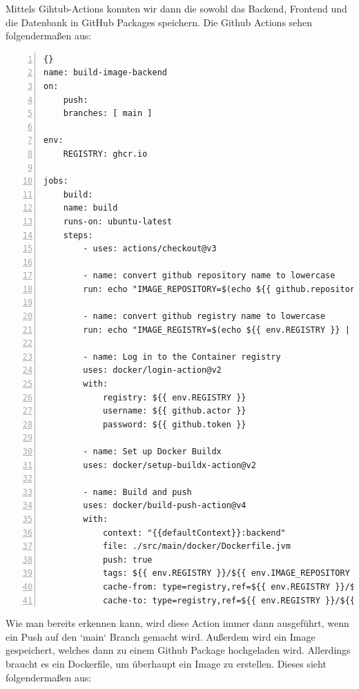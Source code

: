 \newpage

Mittels Gihtub-Actions konnten wir dann die sowohl das Backend, Frontend und die Datenbank in GitHub Packages speichern. Die Github Actions sehen folgendermaßen aus:

\begin{lstlisting}[numbers=left,caption={Github Actions für das Backend},label={lst:gh_action_Backend}]{}
name: build-image-backend
on:
    push:
    branches: [ main ]

env:
    REGISTRY: ghcr.io

jobs:
    build:
    name: build
    runs-on: ubuntu-latest
    steps:
        - uses: actions/checkout@v3

        - name: convert github repository name to lowercase
        run: echo "IMAGE_REPOSITORY=$(echo ${{ github.repository }} | tr '[:upper:]' '[:lower:]')" >> $GITHUB_ENV

        - name: convert github registry name to lowercase
        run: echo "IMAGE_REGISTRY=$(echo ${{ env.REGISTRY }} | tr '[:upper:]' '[:lower:]')" >> $GITHUB_ENV

        - name: Log in to the Container registry
        uses: docker/login-action@v2
        with:
            registry: ${{ env.REGISTRY }}
            username: ${{ github.actor }}
            password: ${{ github.token }}

        - name: Set up Docker Buildx
        uses: docker/setup-buildx-action@v2

        - name: Build and push
        uses: docker/build-push-action@v4
        with:
            context: "{{defaultContext}}:backend"
            file: ./src/main/docker/Dockerfile.jvm
            push: true
            tags: ${{ env.REGISTRY }}/${{ env.IMAGE_REPOSITORY }}-backend:latest
            cache-from: type=registry,ref=${{ env.REGISTRY }}/${{ env.IMAGE_REPOSITORY }}-backend:buildcache
            cache-to: type=registry,ref=${{ env.REGISTRY }}/${{ env.IMAGE_REPOSITORY }}-backend:buildcache,mode=max
\end{lstlisting}

\newpage

Wie man bereits erkennen kann, wird diese Action immer dann ausgeführt, wenn ein Push auf den `main` Branch gemacht wird. Außerdem wird ein Image gespeichert, welches dann zu einem Github Package hochgeladen wird. Allerdings braucht es ein Dockerfile, um überhaupt ein Image zu erstellen. Dieses sieht folgendermaßen aus:


